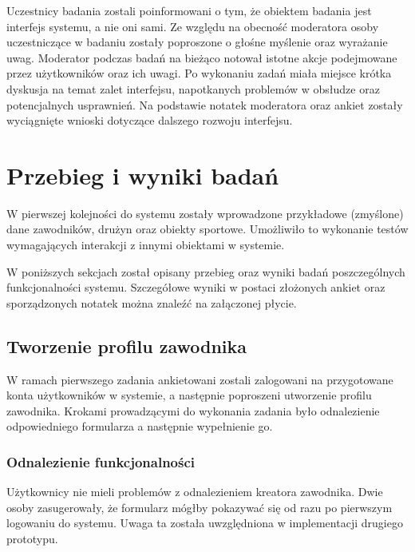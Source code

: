 Uczestnicy badania zostali poinformowani o tym, że obiektem badania jest interfejs systemu, a nie oni sami. Ze względu na obecność moderatora osoby uczestniczące w badaniu zostały poproszone o głośne myślenie oraz wyrażanie uwag. Moderator podczas badań na bieżąco notował istotne akcje podejmowane przez użytkowników oraz ich uwagi. Po wykonaniu zadań miała miejsce krótka dyskusja na temat zalet interfejsu, napotkanych problemów w obsłudze oraz potencjalnych usprawnień. Na podstawie notatek moderatora oraz ankiet zostały wyciągnięte wnioski dotyczące dalszego rozwoju interfejsu.

\section{Przebieg i wyniki badań}

W pierwszej kolejności do systemu zostały wprowadzone przykładowe (zmyślone) dane zawodników, drużyn oraz obiekty sportowe. Umożliwiło to wykonanie testów wymagających interakcji z innymi obiektami w systemie.

W poniższych sekcjach został opisany przebieg oraz wyniki badań poszczególnych funkcjonalności systemu. Szczegółowe wyniki w postaci złożonych ankiet oraz sporządzonych notatek można znaleźć na załączonej płycie.

\subsection{Tworzenie profilu zawodnika}

W ramach pierwszego zadania ankietowani zostali zalogowani na przygotowane konta użytkowników w systemie, a następnie poproszeni utworzenie profilu zawodnika. Krokami prowadzącymi do wykonania zadania było odnalezienie odpowiedniego formularza a następnie wypełnienie go. 

\subsubsection{Odnalezienie funkcjonalności}

Użytkownicy nie mieli problemów z odnalezieniem kreatora zawodnika. Dwie osoby zasugerowały, że formularz mógłby pokazywać się od razu po pierwszym logowaniu do systemu. Uwaga ta została uwzględniona w implementacji drugiego prototypu. 

